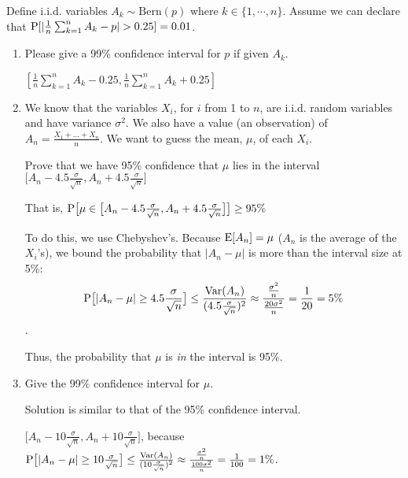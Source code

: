 \question Define i.i.d. variables ${A_k}\sim \text{Bern}(p)$ where 
$k \in \{1, \cdots, n\}$. Assume we can declare that 
$\P[|\frac{1}{n}\sum_{k=1}^n A_k - p| > 0.25] = 0.01$.

\begin{enumerate}[label=(\alph*)]
\item  Please give a 99\% confidence interval  for $p$ if given $A_k$.
\begin{solution}[3cm]
$[\frac{1}{n} \sum_{k=1}^n A_k - 0.25, \frac{1}{n} \sum_{k=1}^n A_k + 0.25]$
\end{solution}

\item We know that the variables $X_i$, for $i$ from 1 to $n$, are i.i.d. 
random variables and have variance $\sigma^2$. We also have a value (an observation) 
of $A_n = \frac{X_1 + \ldots + X_n}{n}$. We want to guess the mean, $\mu$, 
of each $X_i$.

Prove that we have 95\% confidence that $\mu$ lies in the interval
$\big[ A_n - 4.5\frac{\sigma}{\sqrt{n}}, A_n + 4.5\frac{\sigma}{\sqrt{n}} \big]$

That is,
$\P \big[ \mu \in \big[ A_n - 4.5\frac{\sigma}{\sqrt{n}}, A_n + 
4.5\frac{\sigma}{\sqrt{n}} \big] \big] \ge 95\%$
\begin{solution} [3cm]
To do this, we use Chebyshev's. Because $\E[A_n] = \mu$ ($A_n$  is the 
average of the $X_i$’s), we bound the probability that $|A_n - \mu|$ 
is more than the interval size at 5\%:\newline
\[\P\big[ |A_n - \mu| \ge 4.5\frac{\sigma}{\sqrt{n}} \big] \le 
\frac{\text{Var}(A_n)}{(4.5 \frac{\sigma}{\sqrt{n}})^2} \approx 
\frac{\frac{\sigma^2}{n}}{\frac{20\sigma^2}{n}} = \frac{1}{20} = 5\%\].

Thus, the probability that $\mu$ is \textit{in} the interval is 95\%.
\end{solution}

\item Give the 99\% confidence interval for $\mu$.
\begin{solution}[3cm]
Solution is similar to that of the 95\% confidence interval. 

$\big[ A_n - 10\frac{\sigma}{\sqrt{n}}, A_n + 10\frac{\sigma}{\sqrt{n}} 
\big]$, because
$\P\big[ |A_n - \mu| \ge 10\frac{\sigma}{\sqrt{n}} \big] \le 
\frac{\text{Var}(A_n)}{(10 \frac{\sigma}{\sqrt{n}})^2} \approx 
\frac{\frac{\sigma^2}{n}}{\frac{100\sigma^2}{n}} = \frac{1}{100} = 1\%$.
\end{solution}
\end{enumerate}
